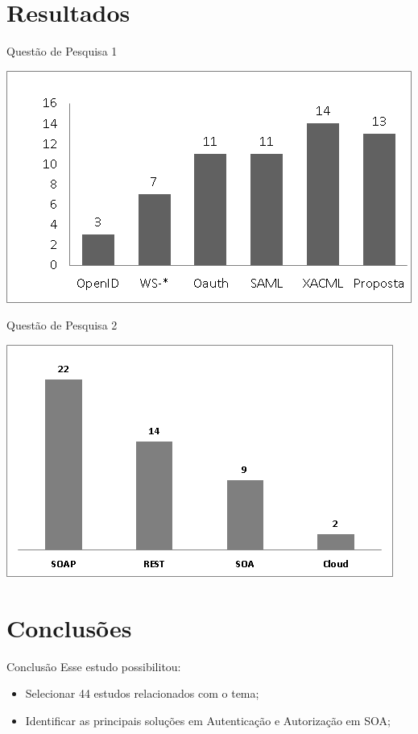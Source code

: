 \documentclass[aspectratio=169, newPxFont]{beamer}
\begin{document}
\section{Resultados}
\begin{frame}{Questão de Pesquisa 1}
	\begin{center}
		\includegraphics[scale = 0.8]{img/protocolos.png}
	\end{center}
\end{frame}

\begin{frame}{Questão de Pesquisa 2}
	\begin{center}
		\includegraphics[scale = 0.8]{img/estilo.png}
	\end{center}
\end{frame}


\section{Conclusões}
\begin{frame}{Conclusão}
	Esse estudo possibilitou:
	\begin{itemize}
		\item Selecionar 44 estudos relacionados com o tema;
		\item Identificar as principais soluções em Autenticação e Autorização em SOA;
	\end{itemize}
\end{frame}
\end{document}
